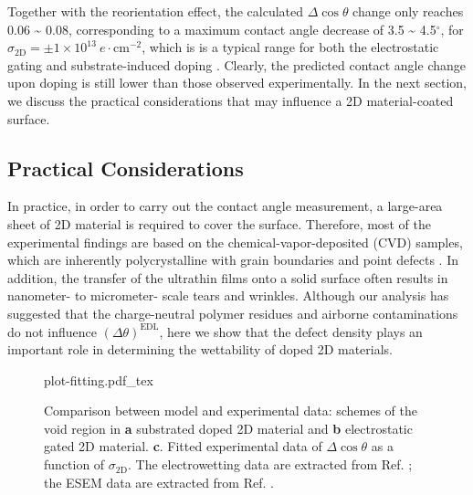 Together with the reorientation effect, the calculated \(\Delta \cos
\theta\) change only reaches 0.06 \textasciitilde{} 0.08, corresponding to a maximum
contact angle decrease of 3.5 \textasciitilde{} 4.5\(^{\circ}\), for
\(\sigma_{\mathrm{2D}}=\pm1\times10^{13}\ e\cdot \mathrm{cm}^{-2}\),
which is is a typical range for both the electrostatic gating
\cite{Hong_2016_mechanism} and substrate-induced doping
\cite{Ashraf_2016_doping}. Clearly, the predicted contact angle
change upon doping is still lower than those observed
experimentally. In the next section, we discuss the practical
considerations that may influence a 2D material-coated surface.


\subsection{Practical Considerations}
\label{sec:orgb997597}

In practice, in order to
carry out the contact angle measurement, a large-area sheet of 2D
material is required to cover the surface. Therefore, most of the
experimental findings are based on the chemical-vapor-deposited (CVD)
samples, which are inherently polycrystalline with grain boundaries
and point defects \cite{Banhart_2011_defect}.  In addition, the transfer
of the ultrathin films onto a solid surface often results in
nanometer- to micrometer- scale tears and wrinkles. Although our
analysis has suggested that the charge-neutral polymer residues and
airborne contaminations do not influence \((\Delta
\theta)^{\mathrm{EDL}}\), here we show that the defect density plays an
important role in determining the wettability of doped 2D
materials.

\begin{figure}[!htbp]
  \centering
  {plot-fitting.pdf_tex}
  \caption{\label{fig:wet-f-nc-exp} Comparison between model and
    experimental data: schemes of the void region in \textbf{a}
    substrated doped 2D material and \textbf{b} electrostatic gated 2D
    material. \textbf{c}. Fitted experimental data of
    \(\Delta\cos\theta\) as a function of
    \(\sigma_{\mathrm{2D}}\). The electrowetting data are extracted
    from Ref. \cite{Hong_2016_mechanism}; the ESEM data are extracted
    from Ref. \cite{Ashraf_2016_doping}.}
\end{figure}


